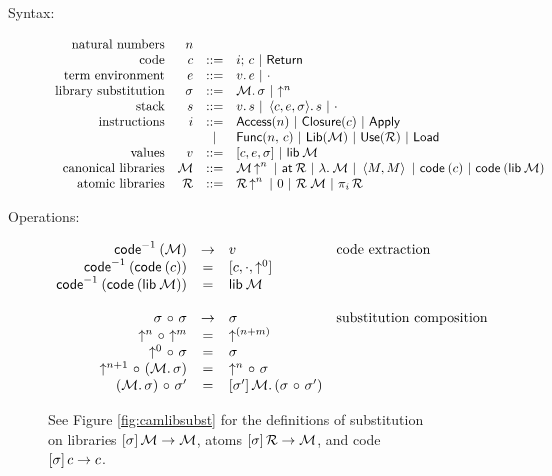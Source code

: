 \documentclass[11pt]{article}
\begin{document}
\begin{figure}
  \centering
  \begin{description}
  \item[Syntax:]
    \[\begin{array}{rrcl}
      \text{natural numbers} & n\\
      \text{code} & c &::=& i;\, c ~|~ \textsf{Return}\\
      \text{term environment} & e &::=& v .\, e ~|~ \cdot\\
      \text{library substitution} &
      \sigma &::=& \mathcal{M} .\, \sigma ~|~ {\uparrow^{n}}\\
      \text{stack} & s &::=& v .\, s ~|~ \left\langle c,e,\sigma\right\rangle\! .\, s ~|~ \cdot\\
      \text{instructions} &
      i &::=& \textsf{Access}(n) ~|~ \textsf{Closure}(c) ~|~ \textsf{Apply}\\
      &&~|~& \textsf{Func}({n},\,{c}) ~|~ \textsf{Lib}(\mathcal{M}) ~|~ \textsf{Use}(\mathcal{R}) ~|~ \textsf{Load}\\
      \text{values} & v &::=& [c,e,\sigma] ~|~ \textsf{lib}\:{\mathcal{M}}\\
      \text{canonical libraries} & \mathcal{M} &::=& {\mathcal{M}}\mathop{\uparrow}^{n} ~|~
      \textsf{at}\:{\mathcal{R}} ~|~ \lambda .\: \mathcal{M} ~|~ \left\langle M,M\right\rangle ~|~
      \textsf{code}\:{(c)} ~|~ \textsf{code}\:{(\textsf{lib}\:{\mathcal{M}})}\\
      \text{atomic libraries} & \mathcal{R} &::=& {\mathcal{R}}\mathop{\uparrow}^{n} ~|~
      0 ~|~ \mathcal{R} \; \mathcal{M} ~|~ \pi_{i} \, \mathcal{R}
    \end{array}\]

  \item[Operations:]\hfill
    \[\begin{array}{rcll}
      \textsf{code}^{-1}\:(\mathcal{M}) &\to& v & \text{code extraction}\\
      \textsf{code}^{-1}\:(\textsf{code}\:{(c)}) &=& [c,\cdot,{\uparrow^{0}}]\\
      \textsf{code}^{-1}\:(\textsf{code}\:{(\textsf{lib}\:{\mathcal{M}})}) &=& \textsf{lib}\:{\mathcal{M}}\\
      \\
      \sigma ~{\circ}~ \sigma &\to& \sigma & \text{substitution composition}\\
      {\uparrow^{n}} ~{\circ}~ {\uparrow^{m}} &=& {\uparrow^{(n + m)}}\\
      {\uparrow^{0}} ~{\circ}~ \sigma &=& \sigma\\
      {\uparrow^{n+1}} ~{\circ}~ (\mathcal{M} .\, \sigma) &=& {\uparrow^{n}} ~{\circ}~ \sigma\\
      (\mathcal{M} .\, \sigma) ~{\circ}~ \sigma' &=& [{\sigma'}]\,{\mathcal{M}} .\, (\sigma ~{\circ}~ \sigma')\\
    \end{array}\]

    See Figure \ref{fig:camlibsubst} for the definitions of substitution on
    libraries $[{\sigma}]\,{\mathcal{M}} \to \mathcal{M}$, atoms $[{\sigma}]\,{\mathcal{R}} \to \mathcal{M}$, and
    code $[{\sigma}]\,{c} \to c$.


\end{description}
\end{figure}
\end{document}
